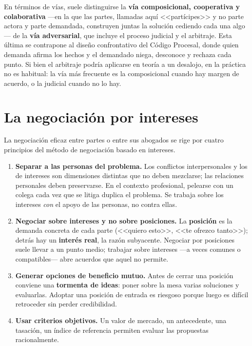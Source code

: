 \documentclass[12pt,oneside]{book}
\begin{document}
En términos de vías, suele distinguirse la \textbf{vía composicional, cooperativa y colaborativa} ---en la que las partes, llamadas aquí <<partícipes>> y no parte actora y parte demandada, construyen juntas la solución cediendo cada una algo--- de la \textbf{vía adversarial}, que incluye el proceso judicial y el arbitraje. Esta última se contrapone al diseño confrontativo del Código Procesal, donde quien demanda afirma los hechos y el demandado niega, desconoce y rechaza cada punto. Si bien el arbitraje podría aplicarse en teoría a un desalojo, en la práctica no es habitual: la vía más frecuente es la composicional cuando hay margen de acuerdo, o la judicial cuando no lo hay.

\section{La negociación por intereses}

La negociación eficaz entre partes o entre sus abogados se rige por cuatro principios del método de negociación basado en intereses.

\begin{enumerate}
\item \textbf{Separar a las personas del problema.} Los conflictos interpersonales y los de intereses son dimensiones distintas que no deben mezclarse; las relaciones personales deben preservarse. En el contexto profesional, pelearse con un colega cada vez que se litiga duplica el problema. Se trabaja sobre los intereses \emph{con} el apoyo de las personas, no contra ellas.
\item \textbf{Negociar sobre intereses y no sobre posiciones.} La \textbf{posición} es la demanda concreta de cada parte (<<quiero esto>>, <<te ofrezco tanto>>); detrás hay un \textbf{interés real}, la razón subyacente. Negociar por posiciones suele llevar a un punto medio; trabajar sobre intereses ---a veces comunes o compatibles--- abre acuerdos que aquel no permite.
\item \textbf{Generar opciones de beneficio mutuo.} Antes de cerrar una posición conviene una \textbf{tormenta de ideas}: poner sobre la mesa varias soluciones y evaluarlas. Adoptar una posición de entrada es riesgoso porque luego es difícil retroceder sin perder credibilidad.
\item \textbf{Usar criterios objetivos.} Un valor de mercado, un antecedente, una tasación, un índice de referencia permiten evaluar las propuestas racionalmente.
\end{enumerate}
\end{document}
